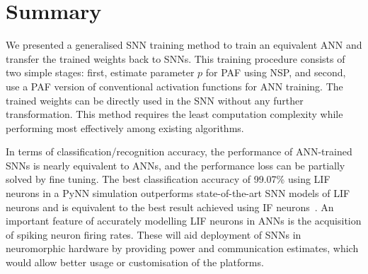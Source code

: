 \section{Summary}
	We presented a generalised SNN training method to train an equivalent ANN and transfer the trained weights back to SNNs.
	This training procedure consists of two simple stages: first, estimate parameter $p$ for PAF using NSP, and second, use a PAF version of conventional activation functions for ANN training. %
	The trained weights can be directly used in the SNN without any further transformation.
	This method requires the least computation complexity while performing most effectively among existing algorithms.
	
	In terms of classification/recognition accuracy, the performance of ANN-trained SNNs is nearly equivalent to ANNs, and the performance loss can be partially solved by fine tuning.
	The best classification accuracy of 99.07\% using LIF neurons in a PyNN simulation outperforms state-of-the-art SNN models of LIF neurons and is equivalent to the best result achieved using IF neurons~\cite{diehl2015fast}.
	An important feature of accurately modelling LIF neurons in ANNs is the acquisition of spiking neuron firing rates. These will aid deployment of SNNs in neuromorphic hardware by providing power and communication estimates, which would allow better usage or customisation of the platforms.